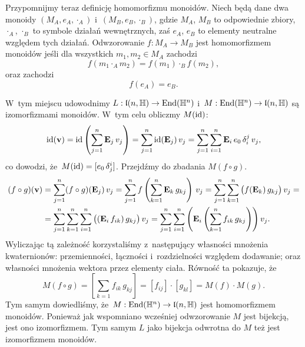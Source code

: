 \documentclass[a4paper,11pt]{article}
\begin{document}
Przypomnijmy teraz definicję homomorfizmu monoidów. Niech będą dane dwa
monoidy $( M_{ A }, e_{ A }, \cdot_{ A } )$ i~$( M_{ B }, e_{ B }, \cdot_{ B } )$, gdzie
$M_{ A }$, $M_{ B }$ to odpowiednie zbiory, $\cdot_{ A }$, $\cdot_{ B }$ to symbole
działań wewnętrznych, zaś $e_{ A }$, $e_{ B }$ to elementy neutralne względem
tych działań. Odwzorowanie $f : M_{ A } \to M_{ B }$ jest homomorfizmem
monoidów jeśli dla wszystkich $m_{ 1 }, m_{ 2 } \in M_{ A }$ zachodzi
\begin{equation}
  \label{eq:Wojtynski-82}
  f( m_{ 1 } \cdot_{ A } m_{ 2 } ) = f( m_{ 1 } ) \cdot_{ B } f( m_{ 2 } ),
\end{equation}
oraz zachodzi
\begin{equation}
  \label{eq:Wojtynski-83}
  f( e_{ A } ) = e_{ B }.
\end{equation}

W~tym miejscu udowodnimy $L : \mathfrak{l}( n, \mathbb{H} ) \to \mathrm{End}( \mathbb{H}^{ n } )$
i~$M : \mathrm{End}( \mathbb{H}^{ n } ) \to \mathfrak{l}( n, \mathbb{H} )$ są izomorfizmami monoidów.
W~tym celu obliczmy $M( \mathrm{id} )$:
\begin{equation}
  \label{eq:Wojtynski-84}
  \mathrm{id}( \mathbf{v} ) =
  \mathrm{id}\left( \sum_{ j = 1 }^{ n } \mathbf{E}_{ j } \, v_{ j } \right) =
  \sum_{ j = 1 }^{ n } \mathrm{id}( \mathbf{E}_{ j } ) \, v_{ j } =
  \sum_{ j = 1 }^{ n } \sum_{ i = 1 }^{ n } \mathbf{E}_{ i } \, e_{ 0 } \,
  \delta^{ j }_{ i } \, v_{ j },
\end{equation}
co dowodzi, że~$M( \mathrm{id} ) = [ e_{ 0 } \, \delta^{ i }_{ j } ]$. Przejdźmy do
zbadania $M( f \circ g )$.
\begin{equation}
  \label{eq:Wojtynski-85}
  \begin{split}
    ( f \circ g )( \mathbf{v} )
    &=
      \sum_{ j = 1 }^{ n } ( f \circ g )( \mathbf{E}_{ j } ) \, v_{ j } =
      \sum_{ j = 1 }^{ n } f\left(
      \sum_{ k = 1 }^{ n } \mathbf{E}_{ k } \, g_{ k j } \right) \, v_{ j } =
      \sum_{ j = 1 }^{ n } \sum_{ k = 1 }^{ n }
      \big( f( \mathbf{E}_{ k } ) \, g_{ k j } \big) \, v_{ j } = \\
    &=
      \sum_{ j = 1 }^{ n } \sum_{ k = 1 }^{ n } \sum_{ i = 1 }^{ n }
      \big( ( \mathbf{E}_{ i } \, f_{ i k } ) \, g_{ k j } \big) \, v_{ j } =
      \sum_{ j = 1 }^{ n } \sum_{ i = 1 }^{ n }
      \left( \mathbf{E}_{ i } \left( \sum_{ k = 1 }^{ n } f_{ i k } \, g_{ k j }
      \right) \right) v_{ j }.
  \end{split}
\end{equation}
Wyliczając tą zależność korzystaliśmy z~następujący własności mnożenia
kwaternionów: przemienności, łączności i~rozdzielności względem dodawanie;
oraz własności mnożenia wektora przez elementy ciała. Równość ta pokazuje,
że
\begin{equation}
  \label{eq:Wojtynski-86}
  M( f \circ g ) = \left[ \sum_{ k = 1 } f_{ i k } \, g_{ k j } \right] =
  [ f_{ i j } ] \cdot [ g_{ k l } ] = M( f ) \cdot M( g ).
\end{equation}
Tym samym dowiedliśmy, że~$M : \mathrm{End}( \mathbb{H}^{ n } ) \to \mathfrak{l}( n, \mathbb{H} )$ jest
homomorfizmem monoidów. Ponieważ jak wspomniano wcześniej odwzorowanie $M$
jest bijekcją, jest ono izomorfizmem. Tym samym $L$ jako bijekcja odwrotna
do $M$ też jest izomorfizmem monoidów.
\end{document}
